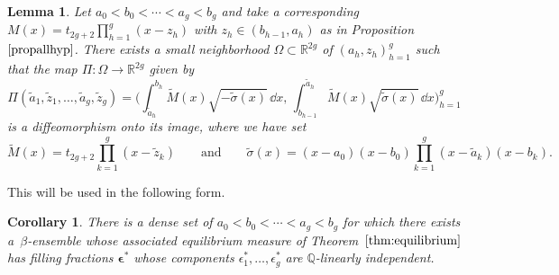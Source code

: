 \documentclass[10pt,a4paper]{amsart}
\numberwithin{equation}{section}
\newtheorem{Corollary}[Theorem]{Corollary}
\newtheorem{Lemma}[Theorem]{Lemma}
\begin{document}
\begin{Lemma}
 \label{periodma}Let $a_0 < b_0 < \cdots < a_g < b_g$ and take a
 corresponding $M(x) = t_{2g + 2} \prod_{h=1}^{g}(x - z_{h})$ with $z_h \in (b_{h - 1},a_h)$ as in
 Proposition~$\ref{propallhyp}$. There exists a small neighborhood
 $\Omega \subset \mathbb{R}^{2g}$ of $(a_h,z_h)_{h = 1}^{g}$ such
 that the map $\Pi \colon \Omega \rightarrow \mathbb{R}^{2g}$ given by
\[
\Pi(\tilde{a}_1,\tilde{z}_1,\ldots,\tilde{a}_g,\tilde{z}_g) = \biggl(\int_{\tilde{a}_h}^{b_h} \tilde{M}(x)\sqrt{-\tilde{\sigma}(x)}\,\dd x,\,\int_{b_{h - 1}}^{\tilde{a}_h} \tilde{M}(x) \sqrt{\tilde{\sigma}(x)}\, \dd x\biggr)_{h = 1}^{g}
\]
is a diffeomorphism onto its image, where we have set
\[
\tilde{M}(x) = t_{2g + 2} \prod_{k=1}^{g}(x - \tilde{z}_k) \qquad \text{and} \qquad \tilde{\sigma}(x) = (x - a_0)(x - b_0)\prod_{k = 1}^{g} (x - \tilde{a}_k)(x -b_k).
\]
\end{Lemma}
This will be used in the following form.
\begin{Corollary}
\label{codense}There is a dense set of $a_0 < b_0 < \cdots < a_g < b_g$ for which there exists \mbox{a~$\beta$-ensemble} whose associated equilibrium measure of Theorem~$\ref{thm:equilibrium}$ has filling fractions $\boldsymbol{\epsilon}^*$ whose components $\epsilon_{1}^*,\ldots,\epsilon_g^*$ are $\mathbb{Q}$-linearly independent.
\end{Corollary}
\end{document}
